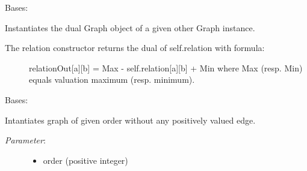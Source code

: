 \documentclass[letterpaper,10pt,english]{sphinxmanual}
\begin{document}
\begin{fulllineitems}
\label{techDoc:graphs.DualGraph}
Bases: {\hyperref[techDoc:graphs.Graph]{\emph{}}}

Instantiates the dual Graph object of a given other Graph instance.
\begin{description}
\item[{The relation constructor returns the dual of self.relation with formula:}] \leavevmode
relationOut{[}a{]}{[}b{]} = Max - self.relation{[}a{]}{[}b{]} + Min
where Max (resp. Min) equals valuation maximum (resp. minimum).

\end{description}

\end{fulllineitems}


\begin{fulllineitems}
\label{techDoc:graphs.EmptyGraph}
Bases: {\hyperref[techDoc:graphs.Graph]{\emph{}}}

Intantiates graph of given order without any positively valued edge.
\begin{description}
\item[{\emph{Parameter}:}] \leavevmode\begin{itemize}
\item {} 
order (positive integer)

\end{itemize}

\end{description}

\end{fulllineitems}

\end{document}
